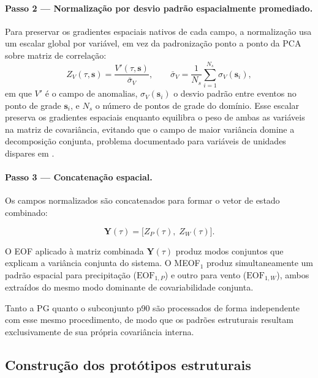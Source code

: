 \paragraph{Passo 2 — Normalização por desvio padrão espacialmente promediado.} Para preservar os gradientes espaciais nativos de cada campo, a normalização usa um escalar global por variável, em vez da padronização ponto a ponto da PCA sobre matriz de correlação:
\begin{equation}\label{eq:meof_normalizacion}
    Z_{V}(\tau, \mathbf{s}) =
        \frac{V'(\tau, \mathbf{s})}{\bar{\sigma}_{V}},
    \qquad
    \bar{\sigma}_{V} = \frac{1}{N_s} \sum_{i=1}^{N_s} \sigma_{V}(\mathbf{s}_i),
\end{equation}
em que $V'$ é o campo de anomalias, $\sigma_{V}(\mathbf{s}_i)$ o desvio padrão entre eventos no ponto de grade $\mathbf{s}_i$, e $N_s$ o número de pontos de grade do domínio. Esse escalar preserva os gradientes espaciais enquanto equilibra o peso de ambas as variáveis na matriz de covariância, evitando que o campo de maior variância domine a decomposição conjunta, problema documentado para variáveis de unidades dispares em \citet{wilks2019statistical_ch13}.

\paragraph{Passo 3 — Concatenação espacial.} Os campos normalizados são concatenados para formar o vetor de estado combinado:

\begin{equation}\label{eq:meof_vector}
    \mathbf{Y}(\tau) = \big[ Z_P(\tau),\; Z_W(\tau) \big].
\end{equation}

O EOF aplicado à matriz combinada $\mathbf{Y}(\tau)$ produz modos conjuntos que explicam a variância conjunta do sistema. O MEOF$_1$ produz simultaneamente um padrão espacial para precipitação ($\text{EOF}_{1,P}$) e outro para vento ($\text{EOF}_{1,W}$), ambos extraídos do mesmo modo dominante de covariabilidade conjunta.

Tanto a PG quanto o subconjunto p90 são processados de forma independente com esse mesmo procedimento, de modo que os padrões estruturais resultam exclusivamente de sua própria covariância interna.

\subsection{Construção dos protótipos estruturais}\label{subsec:prototipos}

